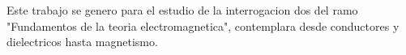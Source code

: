 \documentclass[
	spanish, %
	letterpaper, oneside
]{article}
\begin{document}
	
\templatePortrait

\templatePagecfg

\begin{abstractd}
	Este trabajo se genero para el estudio de la interrogacion dos del ramo "Fundamentos de la teoria electromagnetica", contemplara desde conductores y dielectricos hasta magnetismo.
\end{abstractd}

\templateIndex

\templateFinalcfg



\end{document}
